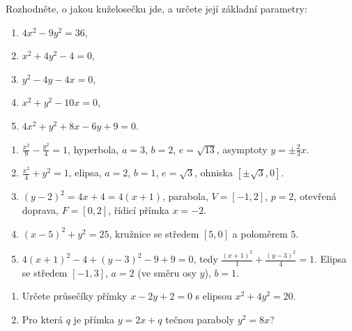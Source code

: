\begin{problem}
  Rozhodněte, o jakou kuželosečku jde, a určete její základní parametry:
  \begin{enumerate}[label=(\alph*)]
    \item $4x^2 - 9y^2 = 36$,
    \item $x^2 + 4y^2 - 4 = 0$,
    \item $y^2 - 4y - 4x = 0$,
    \item $x^2 + y^2 - 10x = 0$,
    \item $4x^2 + y^2 + 8x - 6y + 9 = 0$.
  \end{enumerate}
\end{problem}

\begin{solution}
  \begin{enumerate}[label=(\alph*)]
    \item $\frac{x^2}{9} - \frac{y^2}{4} = 1$, hyperbola, $a = 3$, $b = 2$, $e = \sqrt{13}$, asymptoty $y = \pm\frac{2}{3}x$.
    \item $\frac{x^2}{4} + y^2 = 1$, elipsa, $a = 2$, $b = 1$, $e = \sqrt{3}$, ohniska $[\pm\sqrt{3}, 0]$.
    \item ${(y - 2)}^2 = 4x + 4 = 4(x + 1)$, parabola, $V = [-1, 2]$, $p = 2$, otevřená doprava, $F = [0, 2]$, řídicí přímka $x = -2$.
    \item ${(x - 5)}^2 + y^2 = 25$, kružnice se středem $[5, 0]$ a poloměrem $5$.
    \item $4{(x + 1)}^2 - 4 + {(y - 3)}^2 - 9 + 9 = 0$, tedy $\frac{{(x + 1)}^2}{1} + \frac{{(y - 3)}^2}{4} = 1$. Elipsa se středem $[-1, 3]$, $a = 2$ (ve směru osy $y$), $b = 1$.
  \end{enumerate}
\end{solution}

\begin{problem}
  \begin{enumerate}[label=(\alph*)]
    \item Určete průsečíky přímky $x - 2y + 2 = 0$ s elipsou $x^2 + 4y^2 = 20$.
    \item Pro která $q$ je přímka $y = 2x + q$ tečnou paraboly $y^2 = 8x$?
  \end{enumerate}
\end{problem}

